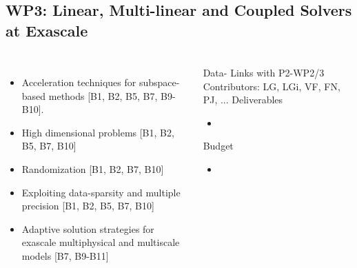 \subsection{WP3: Linear, Multi-linear and Coupled Solvers at Exascale}
\begin{frame}
  \frametitle{\insertsectionhead}
  \framesubtitle{\insertsubsectionhead}
  \begin{columns}
    \begin{itemize}
      \item Acceleration techniques for subspace-based methods [B1, B2, B5, B7, B9-B10].
      \item High dimensional problems [B1, B2, B5, B7, B10] 
      \item Randomization [B1, B2, B7, B10]
      \item Exploiting data-sparsity and multiple precision [B1, B2, B5, B7, B10]
      \item Adaptive solution strategies for exascale multiphysical and multiscale models [B7, B9-B11] 
    \end{itemize}

    \begin{alertblock}{Data- Links with P2-WP2/3   }
    Contributors: LG, LGi, VF, FN, PJ, ...
    Deliverables
    \begin{itemize}
      \item 
      \end{itemize}
      Budget
      \begin{itemize}
        \item 
        \end{itemize}
  \end{alertblock}
  \end{columns}

\end{frame}

